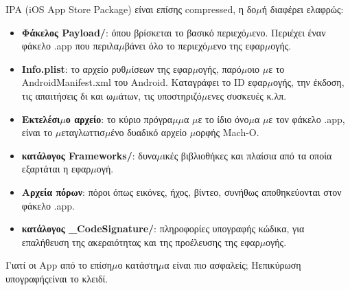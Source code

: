 
IPA (iOS App Store Package) είναι επίσης compressed, η δο$\mu$ή διαφέρει ελαφρώς:

\begin{itemize}
  \item \textbf{Φάκελος Payload/}: όπου βρίσκεται το βασικό περιεχό$\mu$ενο. Περιέχει έναν φάκελο .app που περιλα$\mu$βάνει όλο το περιεχό$\mu$ενο της εφαρ$\mu$ογής.
  \item \textbf{Info.plist}: το αρχείο ρυθ$\mu$ίσεων της εφαρ$\mu$ογής, παρό$\mu$οιο $\mu$ε το AndroidManifest.xml του Android. Καταγράφει το ID εφαρ$\mu$ογής, την έκδοση, τις απαιτήσεις δι και ω$\mu$άτων, τις υποστηριζό$\mu$ενες συσκευές κ.λπ.
  \item \textbf{Εκτελέσι$\mu$ο αρχείο}: το κύριο πρόγρα$\mu$$\mu$α $\mu$ε το ίδιο όνο$\mu$α $\mu$ε τον φάκελο .app, είναι το $\mu$εταγλωττισ$\mu$ένο δυαδικό αρχείο $\mu$ορφής Mach-O.
  \item \textbf{κατάλογος Frameworks/}: δυνα$\mu$ικές βιβλιοθήκες και πλαίσια από τα οποία εξαρτάται η εφαρ$\mu$ογή.
  \item \textbf{Αρχεία πόρων}: πόροι όπως εικόνες, ήχος, βίντεο, συνήθως αποθηκεύονται στον φάκελο .app.
  \item \textbf{κατάλογος \_CodeSignature/}: πληροφορίες υπογραφής κώδικα, για επαλήθευση της ακεραιότητας και της προέλευσης της εφαρ$\mu$ογής.
\end{itemize}


Γιατί οι App από το επίση$\mu$ο κατάστη$\mu$α είναι πιο ασφαλείς; Ηεπικύρωση υπογραφήςείναι το κλειδί.

